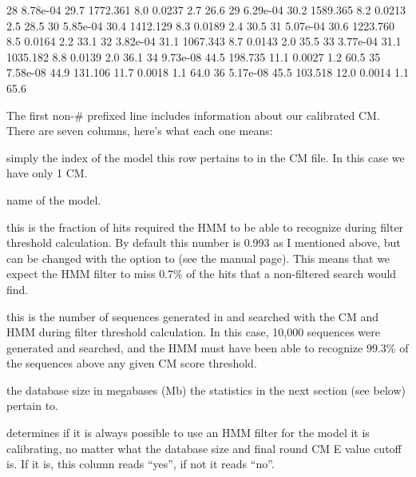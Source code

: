 \begin{sreoutput}
          28    8.78e-04    29.7    1772.361     8.0  0.0237      2.7     26.6
          29    6.29e-04    30.2    1589.365     8.2  0.0213      2.5     28.5
          30    5.85e-04    30.4    1412.129     8.3  0.0189      2.4     30.5
          31    5.07e-04    30.6    1223.760     8.5  0.0164      2.2     33.1
          32    3.82e-04    31.1    1067.343     8.7  0.0143      2.0     35.5
          33    3.77e-04    31.1    1035.182     8.8  0.0139      2.0     36.1
          34    9.73e-08    44.5     198.735    11.1  0.0027      1.2     60.5
          35    7.58e-08    44.9     131.106    11.7  0.0018      1.1     64.0
          36    5.17e-08    45.5     103.518    12.0  0.0014      1.1     65.6
\end{sreoutput}

The first non-\# prefixed line includes information about our
calibrated CM. There are seven columns, here's what each one
means:

\begin{wideitem}

\item[\emprog{idx}] simply the index of the model this row pertains to in
  the CM file. In this case we have only 1 CM.

\item[\emprog{name}] name of the model.

\item[\emprog{F}] this is the fraction of hits 
  required the HMM to be able to recognize during filter threshold
  calculation. By default this number is 0.993 as I mentioned above,
  but can be changed with the  option to 
  (see the manual page). This means that we expect the HMM filter to miss
  $0.7\%$ of the hits that a non-filtered search would find.

\item[\emprog{nseq}] this is the number of sequences generated in 
  and searched with the CM and HMM during filter threshold
  calculation. In this case, 10,000 sequences were generated and
  searched, and the HMM must have been able to recognize $99.3\%$ of the
  sequences above any given CM score threshold. 

\item[\emprog{db (Mb)}] the database size in megabases (Mb) the
  statistics in the next section (see below) pertain to.

\item[\emprog{always?}]  determines if it is always
  possible to use an HMM filter for the model it is calibrating, no
  matter what the database size and final round CM E value cutoff
  is. If it is, this column reads ``yes'', if not it reads ``no''.

\end{wideitem}

